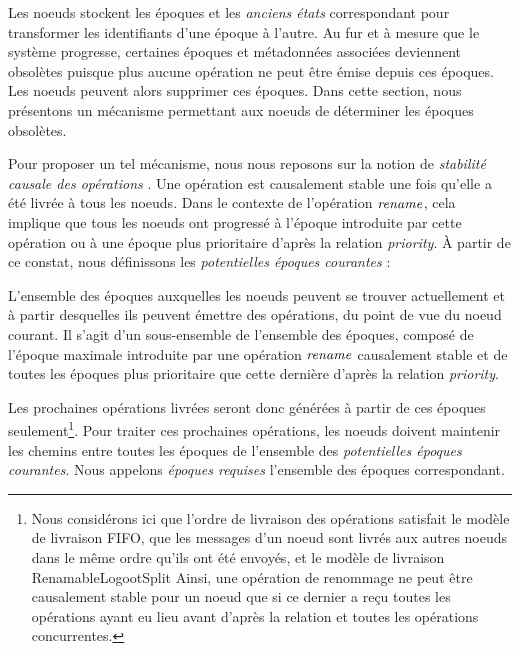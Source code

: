 \label{sec:gc-mechanism}

Les noeuds stockent les époques et les \emph{anciens états} correspondant pour transformer les identifiants d'une époque à l'autre.
Au fur et à mesure que le système progresse, certaines époques et métadonnées associées deviennent obsolètes puisque plus aucune opération ne peut être émise depuis ces époques.
Les noeuds peuvent alors supprimer ces époques.
Dans cette section, nous présentons un mécanisme permettant aux noeuds de déterminer les époques obsolètes.

Pour proposer un tel mécanisme, nous nous reposons sur la notion de \emph{stabilité causale des opérations} \cite{10.1007/978-3-662-43352-2_11}.
Une opération est causalement stable une fois qu'elle a été livrée à tous les noeuds.
Dans le contexte de l'opération $\mathit{rename}$, cela implique que tous les noeuds ont progressé à l'époque introduite par cette opération ou à une époque plus prioritaire d'après la relation \emph{priority}.
À partir de ce constat, nous définissons les \emph{potentielles époques courantes} :

\begin{definition}
  L'ensemble des époques auxquelles les noeuds peuvent se trouver actuellement et à partir desquelles ils peuvent émettre des opérations, du point de vue du noeud courant.
  Il s'agit d'un sous-ensemble de l'ensemble des époques, composé de l'époque maximale introduite par une opération $\mathit{rename}$ causalement stable et de toutes les époques plus prioritaire que cette dernière d'après la relation \emph{priority}.
\end{definition}

Les prochaines opérations livrées seront donc générées à partir de ces époques seulement\footnote{
    Nous considérons ici que l'ordre de livraison des opérations satisfait le modèle de livraison FIFO, \ie que les messages d'un noeud sont livrés aux autres noeuds dans le même ordre qu'ils ont été envoyés, et le modèle de livraison RenamableLogootSplit 
    Ainsi, une opération de renommage ne peut être causalement stable pour un noeud que si ce dernier a reçu toutes les opérations ayant eu lieu avant d'après la relation \hb et toutes les opérations concurrentes.
}.
Pour traiter ces prochaines opérations, les noeuds doivent maintenir les chemins entre toutes les époques de l'ensemble des \emph{potentielles époques courantes}.
Nous appelons \emph{époques requises} l'ensemble des époques correspondant.

